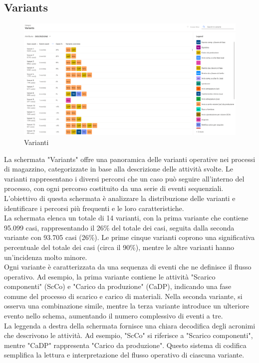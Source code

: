 \documentclass{article}
\begin{document}
\subsection{Variants}
\begin{figure}[H]
    \centering
    \includegraphics[width=\textwidth]{imgMicrosoft/DatiReali/VariantsDatiReali.png}
    \caption{Varianti}
    \label{fig:variants}
\end{figure}
La schermata "Variants" offre una panoramica delle varianti operative nei processi di magazzino, categorizzate in base alla descrizione delle attività svolte. Le varianti rappresentano i diversi percorsi che un caso può seguire all'interno del processo, con ogni percorso costituito da una serie di eventi sequenziali. L'obiettivo di questa schermata è analizzare la distribuzione delle varianti e identificare i percorsi più frequenti e le loro caratteristiche.\\
La schermata elenca un totale di 14 varianti, con la prima variante che contiene 95.099 casi, rappresentando il 26\% del totale dei casi, seguita dalla seconda variante con 93.705 casi (26\%). Le prime cinque varianti coprono una significativa percentuale del totale dei casi (circa il 90\%), mentre le altre varianti hanno un'incidenza molto minore.\\
Ogni variante è caratterizzata da una sequenza di eventi che ne definisce il flusso operativo. Ad esempio, la prima variante contiene le attività "Scarico componenti" (ScCo) e "Carico da produzione" (CaDP), indicando una fase comune del processo di scarico e carico di materiali. Nella seconda variante, si osserva una combinazione simile, mentre la terza variante introduce un ulteriore evento nello schema, aumentando il numero complessivo di eventi a tre.\\
La leggenda a destra della schermata fornisce una chiara decodifica degli acronimi che descrivono le attività. Ad esempio, "ScCo" si riferisce a "Scarico componenti", mentre "CaDP" rappresenta "Carico da produzione". Questo sistema di codifica semplifica la lettura e interpretazione del flusso operativo di ciascuna variante.\\
\end{document}
